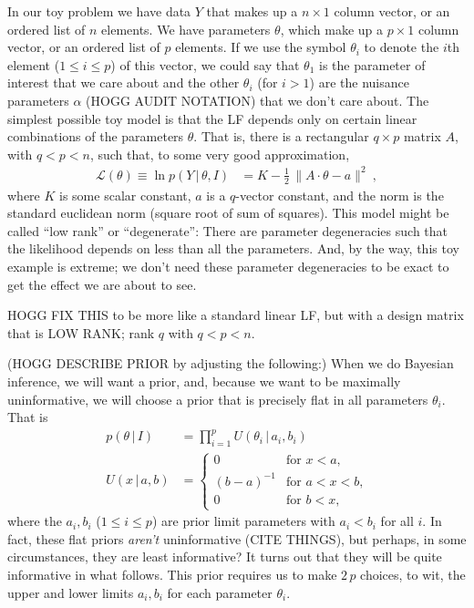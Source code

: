 \documentclass{article}
\newcommand{\given}{\,|\,}
\newcommand{\norm}[1]{\lVert{#1}\rVert}
\begin{document}
In our toy problem we have data $Y$ that makes up a $n\times 1$ column vector, or an ordered list of $n$ elements.
We have parameters $\theta$, which make up a $p\times 1$ column vector, or an ordered list of $p$ elements.
If we use the symbol $\theta_i$ to denote the $i$th element ($1\leq i\leq p$) of this vector, we could say that $\theta_1$ is the parameter of interest that we care about and the other $\theta_i$ (for $i>1$) are the nuisance parameters $\alpha$ (HOGG AUDIT NOTATION) that we don't care about.
The simplest possible toy model is that the LF depends only on certain linear combinations of the parameters $\theta$.
That is, there is a rectangular $q\times p$ matrix $A$, with $q<p<n$, such that, to some very good approximation,
\begin{align}
    \mathscr{L}(\theta) \equiv \ln p(Y\given\theta,I) &= K - \frac{1}{2}\,\norm{A\cdot\theta - a}^2 ~,\label{eq:toyLF}
\end{align}
where $K$ is some scalar constant, $a$ is a $q$-vector constant, and the norm is the standard euclidean norm (square root of sum of squares).
This model might be called ``low rank'' or ``degenerate'':
There are parameter degeneracies such that the likelihood depends on less than all the parameters.
And, by the way, this toy example is extreme; we don't need these parameter degeneracies to be exact to get the effect we are about to see.

HOGG FIX THIS to be more like a standard linear LF, but with a design matrix that is LOW RANK; rank $q$ with $q<p<n$.

(HOGG DESCRIBE PRIOR by adjusting the following:)
When we do Bayesian inference, we will want a prior, and, because we want to be maximally uninformative, we will choose a prior that is precisely flat in all parameters $\theta_i$.
That is
\begin{align}
    p(\theta\given I) &= \prod_{i=1}^p U(\theta_i\given a_i, b_i) \\
    U(x\given a, b) & = \left\{\begin{array}{cl}
    0 & \mbox{for $x<a$,} \\
    (b-a)^{-1} & \mbox{for $a<x<b$,} \\
    0 & \mbox{for $b<x$,}\end{array}\right.
\end{align}
where the $a_i, b_i$ ($1\leq i\leq p$) are prior limit parameters with $a_i<b_i$ for all $i$.
In fact, these flat priors \emph{aren't} uninformative (CITE THINGS), but perhaps, in some circumstances, they are least informative?
It turns out that they will be quite informative in what follows.
This prior requires us to make $2\,p$ choices, to wit, the upper and lower limits $a_i, b_i$ for each parameter $\theta_i$.
\end{document}
